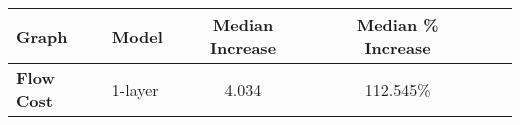\begin{tabular}{llcccc}
\toprule
\textbf{Graph} & \textbf{Model} & \textbf{Median Increase} & \textbf{Median \% Increase}\\
\midrule
\textbf{Flow Cost} & 1-layer & 4.034 & 112.545\%\\
\bottomrule
\end{tabular}
